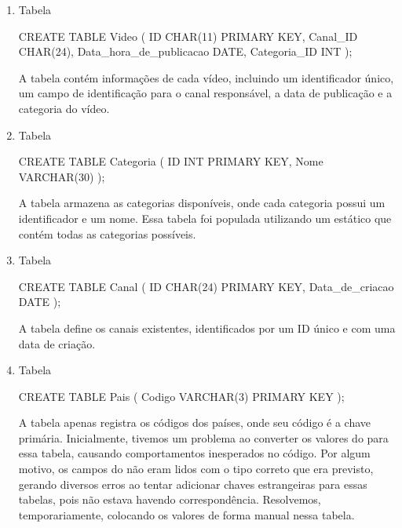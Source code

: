 \begin{enumerate}
  \item Tabela 

  \begin{code}
    CREATE TABLE Video (
      ID CHAR(11) PRIMARY KEY,
      Canal_ID CHAR(24),
      Data_hora_de_publicacao DATE,
      Categoria_ID INT
    );
  \end{code}

  A tabela  contém informações de cada vídeo, incluindo um identificador único, um campo de identificação para o canal responsável, a data de publicação e a categoria do vídeo.

  \item Tabela 

  \begin{code}
    CREATE TABLE Categoria (
      ID INT PRIMARY KEY,
      Nome VARCHAR(30)
    );
  \end{code}

  A tabela  armazena as categorias disponíveis, onde cada categoria possui um identificador e um nome. Essa tabela foi populada utilizando um  estático que contém todas as categorias possíveis.

  \item Tabela 

  \begin{code}
    CREATE TABLE Canal (
      ID CHAR(24) PRIMARY KEY,
      Data_de_criacao DATE
    );
  \end{code}

  A tabela  define os canais existentes, identificados por um ID único e com uma data de criação.

  \item Tabela 

  \begin{code}
    CREATE TABLE Pais (
      Codigo VARCHAR(3) PRIMARY KEY
    );
  \end{code}

  A tabela  apenas registra os códigos dos países, onde seu código é a chave primária. Inicialmente, tivemos um problema ao converter os valores do  para essa tabela, causando comportamentos inesperados no código. Por algum motivo, os campos do  não eram lidos com o tipo correto que era previsto, gerando diversos erros ao tentar adicionar chaves estrangeiras para essas tabelas, pois não estava havendo correspondência. Resolvemos, temporariamente, colocando os valores de forma manual nessa tabela.


\end{enumerate}
